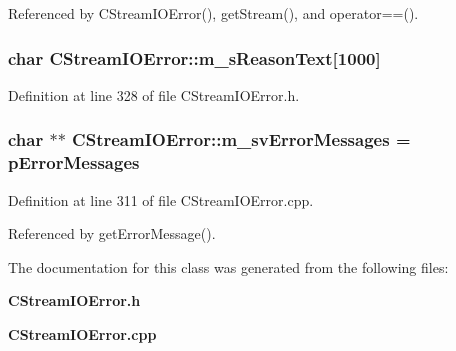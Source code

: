 Referenced by CStream\-IOError(), get\-Stream(), and operator==().
\subsubsection{\setlength{\rightskip}{0pt plus 5cm}char CStream\-IOError::m\_\-s\-Reason\-Text[1000]\hspace{0.3cm}{\tt  [private]}}\label{classCStreamIOError_o2}




Definition at line 328 of file CStream\-IOError.h.
\subsubsection{\setlength{\rightskip}{0pt plus 5cm}char $\ast$$\ast$ CStream\-IOError::m\_\-sv\-Error\-Messages = {\bf p\-Error\-Messages}\hspace{0.3cm}{\tt  [static, private]}}\label{classCStreamIOError_r0}




Definition at line 311 of file CStream\-IOError.cpp.

Referenced by get\-Error\-Message().

The documentation for this class was generated from the following files:\begin{CompactItemize}
\item 
{\bf CStream\-IOError.h}\item 
{\bf CStream\-IOError.cpp}\end{CompactItemize}
